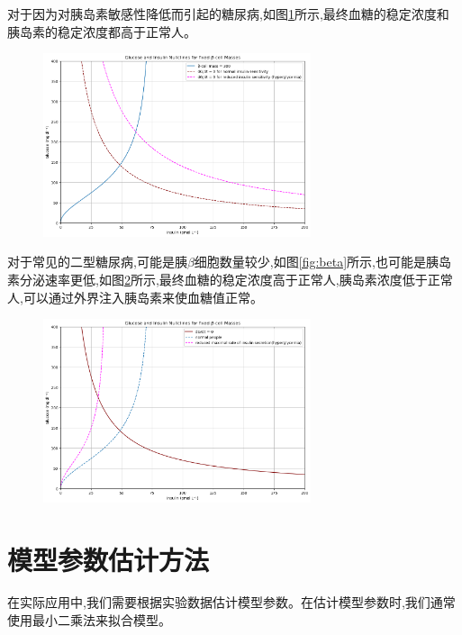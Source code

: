 对于因为对胰岛素敏感性降低而引起的糖尿病,如图\ref{fig:hyperglycemia}所示,最终血糖的稳定浓度和胰岛素的稳定浓度都高于正常人。
\begin{figure}[H]
    \centering
    \includegraphics[width=0.7\textwidth]{Img/hyperglycemia.png}
    \label{fig:hyperglycemia}
\end{figure}

对于常见的二型糖尿病,可能是胰$\beta$细胞数量较少,如图\ref{fig:beta}所示,也可能是胰岛素分泌速率更低,如图\ref{fig:lessinsulin}所示,最终血糖的稳定浓度高于正常人,胰岛素浓度低于正常人,可以通过外界注入胰岛素来使血糖值正常。
\begin{figure}[H]
    \centering
    \includegraphics[width=0.7\textwidth]{Img/lessinsulin.png}
    \label{fig:lessinsulin}
\end{figure}
\section{模型参数估计方法}
在实际应用中,我们需要根据实验数据估计模型参数。在估计模型参数时,我们通常使用最小二乘法来拟合模型。

